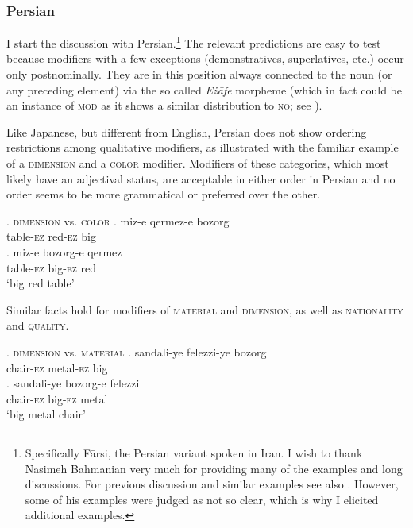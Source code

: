 \subsubsection{Persian} \label{persiananalysis}

I start the discussion with Persian.\footnote{Specifically Fārsi, the Persian variant spoken in Iran. I wish to thank Nasimeh Bahmanian very much for providing many of the examples and long discussions. For previous discussion and similar examples see also \citet{kahne:2014:revisiting}. However, some of his examples were judged as not so clear, which is why I elicited additional examples.} The relevant predictions are easy to test because modifiers with a few exceptions (demonstratives, superlatives, etc.) occur only postnominally. They are in this position always connected to the noun (or any preceding element) via the so called \textit{E{\.z}āfe} morpheme (which in fact could be an instance of \textsc{mod} as it shows a similar distribution to \textsc{no}; see \citealt{toosarvandani:2014:the, gn:2024:morpho}).  

Like Japanese, but different from  English, Persian does not show ordering restrictions among qualitative modifiers, as illustrated with the familiar example of a \textsc{dimension} and a \textsc{color} modifier. Modifiers of these categories, which most likely have an adjectival status, are acceptable in either order in Persian and no order seems to be more grammatical or preferred over the other.

\ex. \textsc{dimension} vs. \textsc{color}
\ag. miz-e qermez-e bozorg\\
table-\textsc{ez} red-\textsc{ez} big\\
\bg. miz-e bozorg-e qermez\\
table-\textsc{ez} big-\textsc{ez} red\\
`big red table'

Similar facts hold for modifiers of \textsc{material} and \textsc{dimension}, as well as \textsc{nationality} and \textsc{quality}.

\ex. \textsc{dimension} vs. \textsc{material}
\ag. sandali-ye felezzi-ye bozorg\\
chair-\textsc{ez} metal-\textsc{ez} big\\
\bg. sandali-ye bozorg-e felezzi\\
chair-\textsc{ez} big-\textsc{ez} metal\\
`big metal chair'

